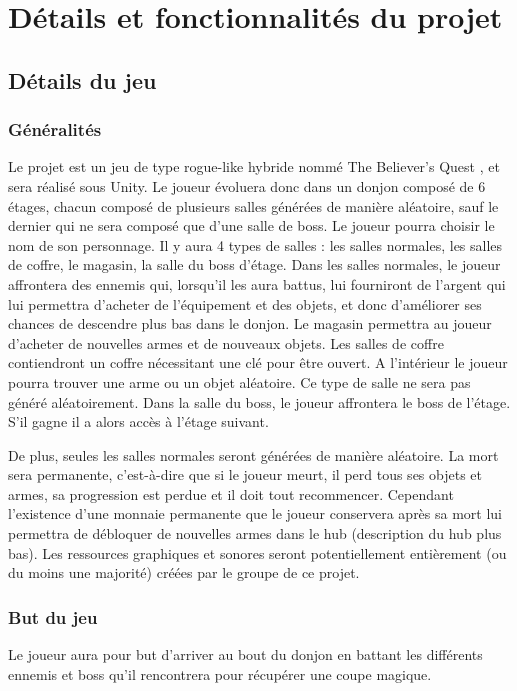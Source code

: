 \documentclass[]{extarticle}
\begin{document}
\newpage
\section{Détails et fonctionnalités du projet}

	\subsection{Détails du jeu}
	
		\subsubsection{Généralités}
\bigbreak
\bigbreak
Le projet est un jeu de type rogue-like hybride nommé \og The Believer’s Quest \fg, et sera réalisé sous Unity. Le joueur évoluera donc dans un donjon composé de 6 étages, chacun composé de plusieurs salles générées de manière aléatoire, sauf le dernier qui ne sera composé que d’une salle de boss. Le joueur pourra choisir le nom de son personnage.
\bigbreak
Il y aura 4 types de salles : les salles normales, les salles de coffre, le magasin, la salle du boss d’étage. Dans les salles normales, le joueur affrontera des ennemis qui, lorsqu’il les aura battus, lui fourniront de l’argent qui lui permettra d’acheter de l’équipement et des objets, et donc d’améliorer ses chances de descendre plus bas dans le donjon. Le magasin permettra au joueur d’acheter de nouvelles armes et de nouveaux objets. Les salles de coffre contiendront un coffre nécessitant une clé pour être ouvert. A l’intérieur le joueur pourra trouver une arme ou un objet aléatoire. Ce type de salle ne sera pas généré aléatoirement. Dans la salle du boss, le joueur affrontera le boss de l’étage. S’il gagne il a alors accès à l’étage suivant.

De plus, seules les salles normales seront générées de manière aléatoire.
\bigbreak
La mort sera permanente, c’est-à-dire que si le joueur meurt, il perd tous ses objets et armes, sa progression est perdue et il doit tout recommencer. Cependant l’existence d’une monnaie permanente que le joueur conservera après sa mort lui permettra de débloquer de nouvelles armes dans le hub (description du hub plus bas).
\bigbreak
Les ressources graphiques et sonores seront potentiellement entièrement (ou du moins une majorité) créées par le groupe de ce projet. 
\bigbreak

		\subsubsection{But du jeu}
\bigbreak
\bigbreak
Le joueur aura pour but d’arriver au bout du donjon en battant les différents ennemis et boss qu’il rencontrera pour récupérer une coupe magique.
\bigbreak
\end{document}
